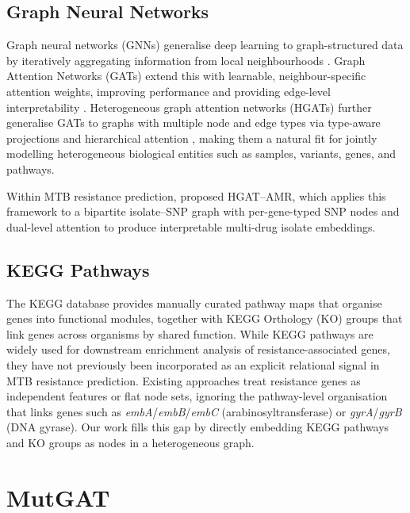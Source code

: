 \documentclass{article}
\theoremstyle{plain}
\theoremstyle{definition}
\theoremstyle{remark}
\begin{document}
\subsection{Graph Neural Networks}
Graph neural networks (GNNs) generalise deep learning to graph-structured data by iteratively aggregating information from local neighbourhoods \citep{kipf2017gcn}. Graph Attention Networks (GATs) extend this with learnable, neighbour-specific attention weights, improving performance and providing edge-level interpretability \citep{velickovic2018gat}. Heterogeneous graph attention networks (HGATs) further generalise GATs to graphs with multiple node and edge types via type-aware projections and hierarchical attention \citep{wang2019han}, making them a natural fit for jointly modelling heterogeneous biological entities such as samples, variants, genes, and pathways.

Within MTB resistance prediction, \citet{yang2021hgat} proposed HGAT--AMR, which applies this framework to a bipartite isolate--SNP graph with per-gene-typed SNP nodes and dual-level attention to produce interpretable multi-drug isolate embeddings.

\subsection{KEGG Pathways}
The KEGG database \citep{kanehisa2000kegg} provides manually curated pathway maps that organise genes into functional modules, together with KEGG Orthology (KO) groups that link genes across organisms by shared function. While KEGG pathways are widely used for downstream enrichment analysis of resistance-associated genes, they have not previously been incorporated as an explicit relational signal in MTB resistance prediction. Existing approaches treat resistance genes as independent features or flat node sets, ignoring the pathway-level organisation that links genes such as \textit{embA}/\textit{embB}/\textit{embC} (arabinosyltransferase) or \textit{gyrA}/\textit{gyrB} (DNA gyrase). Our work fills this gap by directly embedding KEGG pathways and KO groups as nodes in a heterogeneous graph.


\section{MutGAT}
\label{sec:method}
\end{document}
